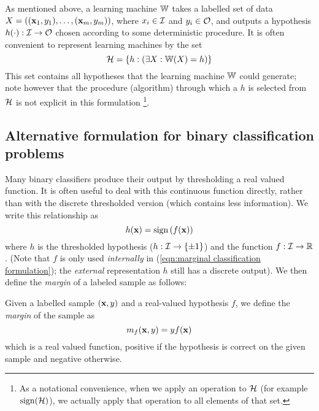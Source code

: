 As mentioned above, a learning machine $\mathbb{W}$ takes a labelled set of
data $X = ((\mathbf{x}_1, y_1), \ldots, (\mathbf{x}_m, y_m))$, where $x_i \in
\mathcal{I}$ and $y_i \in \mathcal{O}$, and outputs a hypothesis $h(\cdot) : \mathcal{I}
\rightarrow \mathcal{O}$ chosen according to some deterministic procedure.
It is often convenient to represent learning machines by the set
%
\begin{equation}
\mathcal{H} = \{h : \left( \exists X : \mathbb{W}(X) = h \right) \}
\end{equation}
%
This set contains all hypotheses that the learning machine $\mathbb{W}$ could
generate; note however that the procedure (algorithm) through which
a $h$ is selected from $\mathcal{H}$ is not explicit in this formulation%
\footnote{As a notational convenience, when we apply an operation to
$\mathcal{H}$ (for example $\mathrm{sign}(\mathcal{H})$), we actually apply that operation
to all elements of that set.}.

\subsection{Alternative formulation for binary classification problems}
\label{sec:margin formulation}

Many binary classifiers produce their output by thresholding a real
valued function.  It is often useful to deal with this continuous
function directly, rather than with the discrete thresholded version
(which contains less information).  We write this relationship as  
%
\begin{equation}
h(\mathbf{x}) = \mathrm{sign} \left( f(\mathbf{x}) \right)
\label{eqn:marginal classification formulation}
\end{equation}
%
where $h$ is the thresholded hypothesis ($h : \mathcal{I} \rightarrow \{\pm
1\}$) and the function $f : \mathcal{I} \rightarrow \mathbb{R}$.  (Note that
$f$ is only used \emph{internally} in (\ref{eqn:marginal
classification formulation}); the \emph{external} representation $h$
still has a discrete output).  We then define the \emph{margin} of a
labeled sample as follows:

\begin{definition}
Given a labelled sample $(\mathbf{x}, y)$ and a real-valued hypothesis
$f$, we define the \emph{margin} of the sample as
%
\begin{equation}
m_{f}(\mathbf{x},y) = y f(\mathbf{x})
\end{equation}
%
which is a real valued function, positive if the hypothesis is correct
on the given sample and negative otherwise.
\end{definition}

